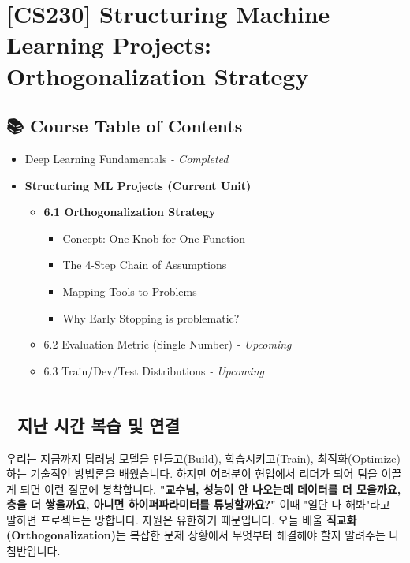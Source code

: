 \documentclass[11pt,a4paper]{book}
\theoremstyle{definition}
\begin{document}
\chapter{[CS230] Structuring Machine Learning Projects: \\ Orthogonalization Strategy}
\label{ch:lecture22}

\section*{📚 Course Table of Contents}
\begin{itemize}
    \item[Chapter 1-5.] Deep Learning Fundamentals \textit{- Completed}
    \item[\textbf{Chapter 6.}] \textbf{Structuring ML Projects (Current Unit)}
    \begin{itemize}
        \item \textbf{6.1 Orthogonalization Strategy}
        \begin{itemize}
            \item Concept: One Knob for One Function
            \item The 4-Step Chain of Assumptions
            \item Mapping Tools to Problems
            \item Why Early Stopping is problematic?
        \end{itemize}
        \item 6.2 Evaluation Metric (Single Number) \textit{- Upcoming}
        \item 6.3 Train/Dev/Test Distributions \textit{- Upcoming}
    \end{itemize}
\end{itemize}

\vspace{0.5cm}
\hrule
\vspace{0.5cm}

\section*{🔗 지난 시간 복습 및 연결}
우리는 지금까지 딥러닝 모델을 만들고(Build), 학습시키고(Train), 최적화(Optimize)하는 기술적인 방법론을 배웠습니다.
하지만 여러분이 현업에서 리더가 되어 팀을 이끌게 되면 이런 질문에 봉착합니다.
\textbf{"교수님, 성능이 안 나오는데 데이터를 더 모을까요, 층을 더 쌓을까요, 아니면 하이퍼파라미터를 튜닝할까요?"}
이때 "일단 다 해봐"라고 말하면 프로젝트는 망합니다. 자원은 유한하기 때문입니다. 오늘 배울 \textbf{직교화(Orthogonalization)}는 복잡한 문제 상황에서 무엇부터 해결해야 할지 알려주는 나침반입니다.
\end{document}
